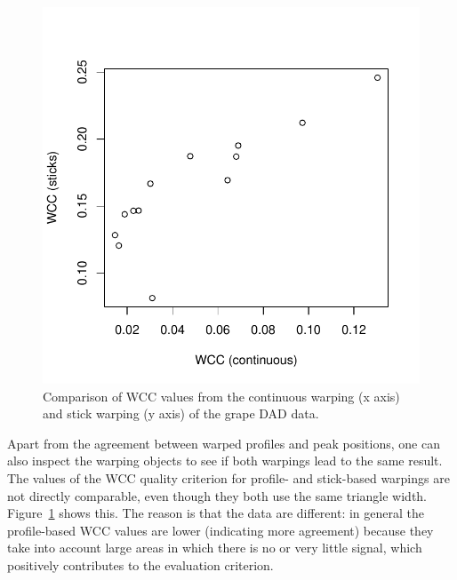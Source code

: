 \documentclass[a4paper,11pt]{article}
\begin{document}
\begin{figure}[tb]
  \centering
\includegraphics{stickPTW-010}
\caption{Comparison of WCC values from the continuous warping (x axis)
and stick warping (y axis) of the grape DAD data.}
\label{fig:wccComparison}
\end{figure}
Apart from the agreement between warped profiles and peak positions,
one can also inspect the warping objects to see if both warpings lead
to the same result. The values of the WCC quality criterion for
profile- and stick-based warpings are not directly comparable, even
though they both use the same triangle
width. Figure~\ref{fig:wccComparison} shows this. The reason is that
the data are different: in general the profile-based WCC values are
lower (indicating more agreement) because they take into account large
areas in which there is no or very little signal, which positively
contributes to the evaluation criterion.
\end{document}
